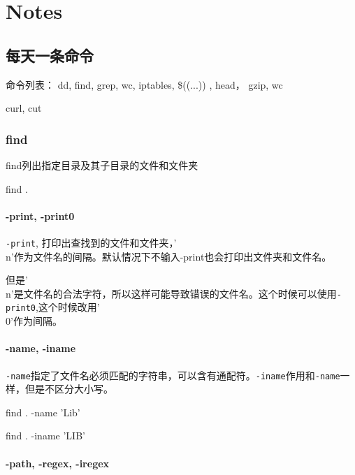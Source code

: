 \chapter{Notes}

\section{每天一条命令}
命令列表：
dd, find, grep, wc, iptables, \$((...)) , head， gzip, wc

curl, cut



\subsection{find}

find列出指定目录及其子目录的文件和文件夹

\begin{Bash}[查找当前目录及子目录的文件和文件夹]
find .
\end{Bash}


\subsubsection{-print, -print0}
\lstinline$-print$, 打印出查找到的文件和文件夹，'\\n'作为文件名的间隔。默认情况下不输入-print也会打印出文件夹和文件名。

但是'\\n'是文件名的合法字符，所以这样可能导致错误的文件名。这个时候可以使用\lstinline$-print0$,这个时候改用'\\0'作为间隔。

\subsubsection{-name, -iname}

\lstinline$-name$指定了文件名必须匹配的字符串，可以含有通配符。\lstinline$-iname$作用和\lstinline$-name$一样，但是不区分大小写。

\begin{Bash}[名字匹配指定的字符串]

find . -name 'Lib'

find . -iname 'LIB'

\end{Bash}


\subsubsection{ -path, -regex, -iregex}


